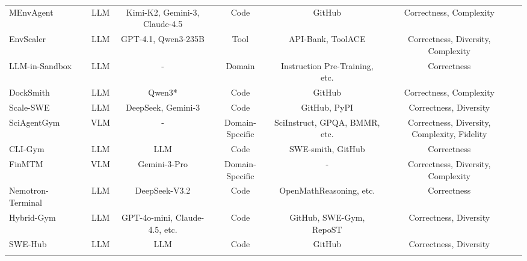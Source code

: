\documentclass{llmxive}
\providecommand{\Text}{
  \begin{tikzpicture}[baseline=(char.base)]
    \fill[textgreen!50] (0,0) circle (0.18);
    \node[white, font=\scriptsize\rmfamily, inner sep=0pt] (char) at (0,0) {T};
  \end{tikzpicture}
}
\providecommand{\Image}{
  \begin{tikzpicture}[baseline=(char.base)]
    \fill[textred!50] (0,0) circle (0.18);
    \node[white, font=\scriptsize\rmfamily, inner sep=0pt] (char) at (0,0) {I};
  \end{tikzpicture}
}
\begin{document}
\begin{table}[htbp]
{\begin{tabular}{lccccccc}
 MEnvAgent\cite{MEnvAgent} & \Text & LLM & Kimi-K2, Gemini-3, Claude-4.5 & Code & GitHub & Correctness, Complexity \\
 EnvScaler\cite{EnvScaler} & \Text & LLM & GPT-4.1, Qwen3-235B & Tool & API-Bank, ToolACE & Correctness, Diversity, Complexity \\
 LLM-in-Sandbox\cite{LLM-in-Sandbox} & \Text & LLM & - & Domain & Instruction Pre-Training, etc. & Correctness \\
 DockSmith\cite{DockSmith} & \Text & LLM & Qwen3* & Code & GitHub & Correctness, Complexity \\
 Scale-SWE\cite{Scale-SWE} & \Text & LLM & DeepSeek, Gemini-3 & Code & GitHub, PyPI & Correctness, Diversity \\
 SciAgentGym\cite{SciAgentGym} & \Text\hspace{-0.4em}\Image & VLM & - & Domain-Specific & SciInstruct, GPQA, BMMR, etc. & Correctness, Diversity, Complexity, Fidelity \\
 CLI-Gym\cite{CLI-Gym} & \Text & LLM & LLM & Code & SWE-smith, GitHub & Correctness \\
 FinMTM\cite{FinMTM} & \Text\hspace{-0.4em}\Image & VLM & Gemini-3-Pro & Domain-Specific & - & Correctness, Diversity, Complexity \\
 Nemotron-Terminal\cite{Nemotron-Terminal} & \Text & LLM & DeepSeek-V3.2 & Code & OpenMathReasoning, etc. & Correctness \\
 Hybrid-Gym\cite{HYBRID-GYM} & \Text & LLM & GPT-4o-mini, Claude-4.5, etc. & Code & GitHub, SWE-Gym, RepoST & Correctness, Diversity \\
 SWE-Hub\cite{SWE-Hub} & \Text & LLM & LLM & Code & GitHub & Correctness, Diversity \\

\midrule
\rowcolor{gray!10!white} \multicolumn{7}{c}{\textbf{\textit{Real-World-Driven Synthesis (\cref{sec:real world driven synthesis})}}}\\ 


\end{tabular}}
\end{table}
\end{document}
